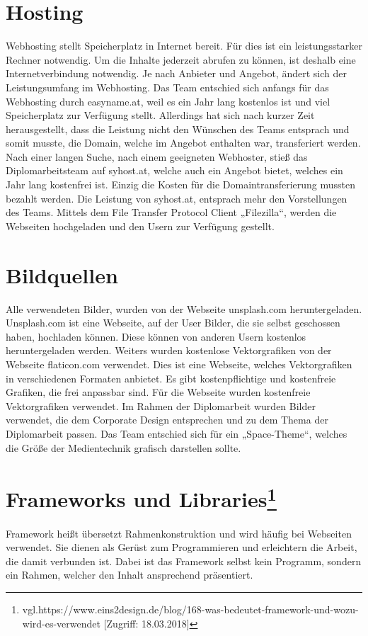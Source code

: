 \section{Hosting}
Webhosting stellt Speicherplatz in Internet bereit. Für dies ist ein leistungsstarker Rechner notwendig. Um die Inhalte jederzeit abrufen zu können, ist deshalb eine Internetverbindung notwendig. Je nach Anbieter und Angebot, ändert sich der Leistungsumfang im Webhosting.   Das Team entschied sich anfangs für das Webhosting durch easyname.at, weil es ein Jahr lang kostenlos ist und viel Speicherplatz zur Verfügung stellt. Allerdings hat sich nach kurzer Zeit herausgestellt, dass die Leistung nicht den Wünschen des Teams entsprach und somit musste, die Domain, welche im Angebot enthalten war, transferiert werden. Nach einer langen Suche, nach einem geeigneten Webhoster, stieß das Diplomarbeitsteam auf syhost.at, welche auch ein Angebot bietet, welches ein Jahr lang kostenfrei ist. Einzig die Kosten für die Domaintransferierung mussten bezahlt werden. Die Leistung von syhost.at, entsprach mehr den Vorstellungen des Teams. Mittels dem File Transfer Protocol Client „Filezilla“, werden die Webseiten hochgeladen und den Usern zur Verfügung gestellt. 



\section{Bildquellen}
Alle verwendeten Bilder, wurden von der Webseite unsplash.com heruntergeladen. Unsplash.com ist eine Webseite, auf der User Bilder, die sie selbst geschossen haben, hochladen können. Diese können von anderen Usern kostenlos heruntergeladen werden. Weiters wurden kostenlose Vektorgrafiken von der Webseite flaticon.com verwendet. Dies ist eine Webseite, welches Vektorgrafiken in verschiedenen Formaten anbietet. Es gibt kostenpflichtige und kostenfreie Grafiken, die frei anpassbar sind. Für die Webseite wurden kostenfreie Vektorgrafiken verwendet. Im Rahmen der Diplomarbeit wurden Bilder verwendet, die dem Corporate Design entsprechen und zu dem Thema der Diplomarbeit passen. Das Team entschied sich für ein „Space-Theme“, welches die Größe der Medientechnik grafisch darstellen sollte. 

\section[Frameworks und Libraries]{Frameworks und Libraries\protect\footnote{\label{foot:2}vgl.https://www.eins2design.de/blog/168-was-bedeutet-framework-und-wozu-wird-es-verwendet [Zugriff: 18.03.2018]}} 
Framework heißt übersetzt Rahmenkonstruktion und wird häufig bei Webseiten verwendet. Sie dienen als Gerüst zum Programmieren und erleichtern die Arbeit, die damit verbunden ist. Dabei ist das Framework selbst kein Programm, sondern ein Rahmen, welcher den Inhalt ansprechend präsentiert. 

